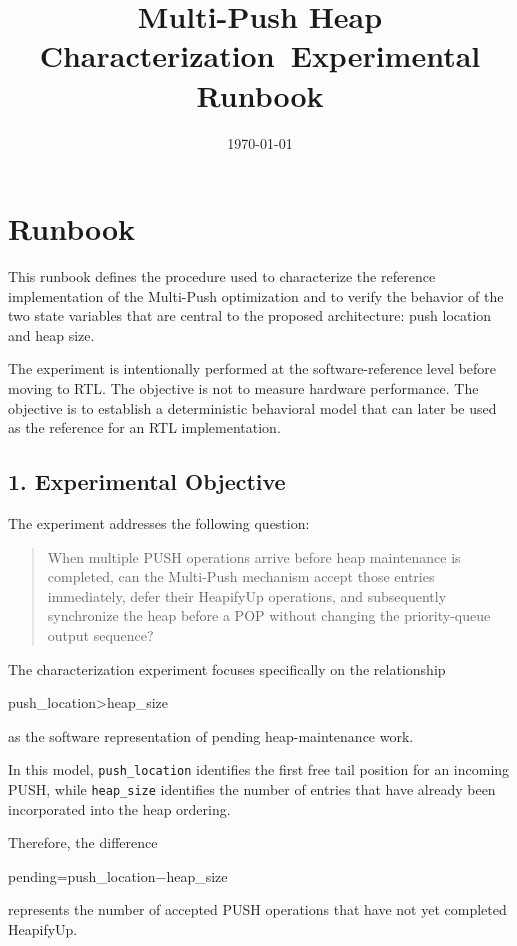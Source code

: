 \documentclass[11pt,a4paper]{article}
\title{Multi-Push Heap Characterization\
Experimental Runbook}
\author{}
\date{\today}
\begin{document}
\maketitle

\section{Runbook}

This runbook defines the procedure used to characterize the reference
implementation of the Multi-Push optimization and to verify the behavior
of the two state variables that are central to the proposed architecture: push location and heap size.

The experiment is intentionally performed at the software-reference level
before moving to RTL. The objective is not to measure hardware performance.
The objective is to establish a deterministic behavioral model that can
later be used as the reference for an RTL implementation.

\subsection{1. Experimental Objective}

The experiment addresses the following question:

\begin{quote}
When multiple PUSH operations arrive before heap maintenance is completed,
can the Multi-Push mechanism accept those entries immediately, defer their
HeapifyUp operations, and subsequently synchronize the heap before a POP
without changing the priority-queue output sequence?
\end{quote}

The characterization experiment focuses specifically on the relationship

push_location>heap_size

as the software representation of pending heap-maintenance work.

In this model, \texttt{push_location} identifies the first free tail
position for an incoming PUSH, while \texttt{heap_size} identifies the
number of entries that have already been incorporated into the heap
ordering.

Therefore, the difference

pending=push_location−heap_size

represents the number of accepted PUSH operations that have not yet
completed HeapifyUp.
\end{document}
